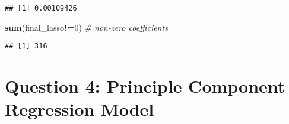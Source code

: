 \documentclass[
]{article}
\newenvironment{Shaded}{\begin{snugshade}}{\end{snugshade}}
\newcommand{\CommentTok}[1]{\textcolor[rgb]{0.56,0.35,0.01}{\textit{#1}}}
\newcommand{\DecValTok}[1]{\textcolor[rgb]{0.00,0.00,0.81}{#1}}
\newcommand{\KeywordTok}[1]{\textcolor[rgb]{0.13,0.29,0.53}{\textbf{#1}}}
\newcommand{\NormalTok}[1]{#1}
\newcommand{\OperatorTok}[1]{\textcolor[rgb]{0.81,0.36,0.00}{\textbf{#1}}}
\begin{document}
\begin{verbatim}
## [1] 0.00109426
\end{verbatim}

\begin{Shaded}
\begin{Highlighting}[]
\KeywordTok{sum}\NormalTok{(final_lasso}\OperatorTok{!=}\DecValTok{0}\NormalTok{) }\CommentTok{# non-zero coefficients}
\end{Highlighting}
\end{Shaded}

\begin{verbatim}
## [1] 316
\end{verbatim}

\hypertarget{question-4-principle-component-regression-model}{%
\section{Question 4: Principle Component Regression
Model}\label{question-4-principle-component-regression-model}}
\end{document}
